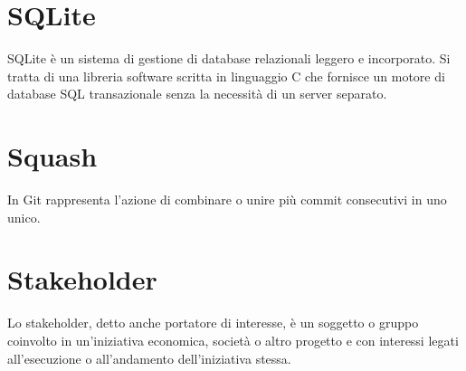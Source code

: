 \section{SQLite}\label{sec:SQLite3}
SQLite è un sistema di gestione di database relazionali leggero e incorporato. Si tratta di una libreria software scritta in linguaggio C che fornisce un motore di database SQL transazionale senza la necessità di un server separato.

\section{Squash}
In Git rappresenta l'azione di combinare o unire più commit consecutivi in uno unico.

\section{Stakeholder}
Lo stakeholder, detto anche portatore di interesse, è un soggetto o gruppo coinvolto in un'iniziativa economica, società o altro progetto e con interessi legati all’esecuzione o all’andamento dell'iniziativa stessa.
